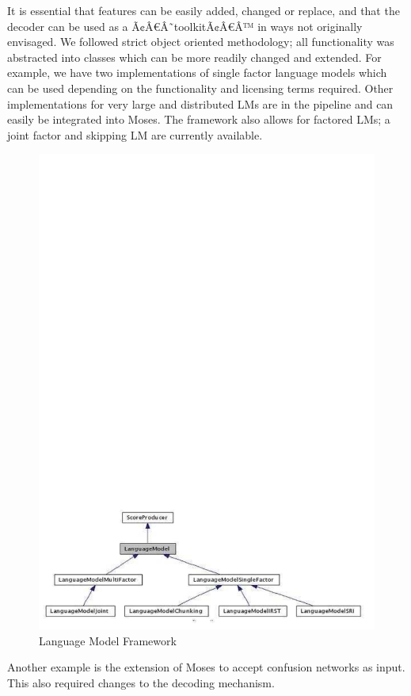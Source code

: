 \documentclass[11pt]{report}
\theoremstyle{plain}
\begin{document}
{It is essential that features can be easily added, changed or replace, and that the decoder can be used as a Ã¢Â€Â˜toolkitÃ¢Â€Â™ in ways not originally envisaged. We followed strict object oriented methodology; all functionality was abstracted into classes which can be more readily changed and extended. For example, we have two implementations of single factor language models which can be used depending on the functionality and licensing terms required. Other implementations for very large and distributed LMs are in the pipeline and can easily be integrated into Moses. The framework also allows for factored LMs; a joint factor and skipping LM are currently available.\\
\begin{center}
\begin{figure}[h]
\centering
\includegraphics[scale=1]{hieu-2}
\caption{Language Model Framework}
\end{figure}
\end{center}
Another example is the extension of Moses to accept confusion networks as input. This also required changes to the decoding mechanism.\\

}
\end{document}
